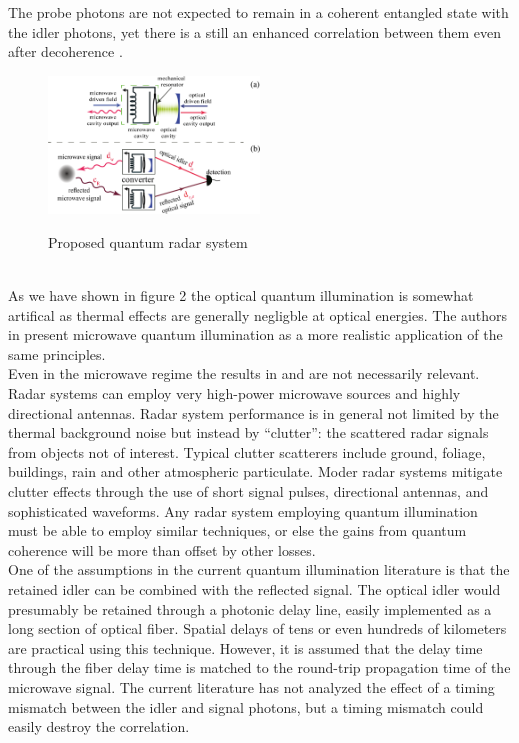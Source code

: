 \documentclass[a4paper,11pt, twocolumn]{article}
\numberwithin{equation}{section}
\begin{document}
The probe photons are not expected to remain in a coherent entangled state with the idler photons, yet there is a still an enhanced correlation between them even after decoherence \cite{qig}. 
\begin{figure}
 \caption{Proposed quantum radar system \cite{qi}}
 \centering
   \includegraphics[width=0.5\textwidth]{figs/QuantumRadar}
 \label{fig:quantumradar}
\end{figure}
\\
As we have shown in figure 2 the optical quantum illumination is somewhat artifical as thermal effects are generally negligble at optical energies.
The authors in \cite{qi} present microwave quantum illumination as a more realistic application of the same principles.
\\
Even in the microwave regime the results in \cite{qig} and \cite{qi} are not necessarily relevant. 
Radar systems can employ very high-power microwave sources and highly directional antennas.
Radar system performance is in general not limited by the thermal background noise but instead by ``clutter'': the scattered radar signals from objects not of interest.
Typical clutter scatterers include ground, foliage, buildings, rain and other atmospheric particulate.
Moder radar systems mitigate clutter effects through the use of short signal pulses, directional antennas, and sophisticated waveforms.
Any radar system employing quantum illumination must be able to employ similar techniques, or else the gains from quantum coherence will be more than offset by other losses. 
\\
One of the assumptions in the current quantum illumination literature is that the retained idler can be combined with the reflected signal.
The optical idler would presumably be retained through a photonic delay line, easily implemented as a long section of optical fiber.
Spatial delays of tens or even hundreds of kilometers are practical using this technique.
However, it is assumed that the delay time through the fiber delay time is matched to the round-trip propagation time of the microwave signal.
The current literature has not analyzed the effect of a timing mismatch between the idler and signal photons, but a timing mismatch could easily destroy the correlation.
\end{document}
